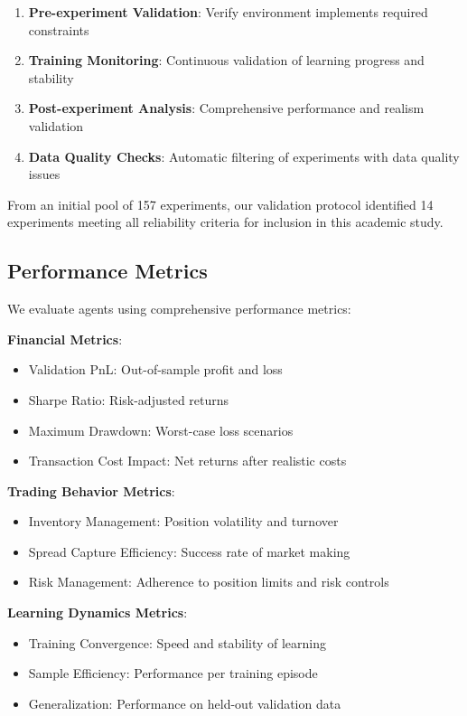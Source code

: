 \documentclass[11pt,a4paper]{article}
\begin{document}
\begin{enumerate}
\item \textbf{Pre-experiment Validation}: Verify environment implements required constraints
\item \textbf{Training Monitoring}: Continuous validation of learning progress and stability
\item \textbf{Post-experiment Analysis}: Comprehensive performance and realism validation
\item \textbf{Data Quality Checks}: Automatic filtering of experiments with data quality issues
\end{enumerate}

From an initial pool of 157 experiments, our validation protocol identified 14 experiments meeting all reliability criteria for inclusion in this academic study.

\subsection{Performance Metrics}

We evaluate agents using comprehensive performance metrics:

\textbf{Financial Metrics}:
\begin{itemize}
\item Validation PnL: Out-of-sample profit and loss
\item Sharpe Ratio: Risk-adjusted returns
\item Maximum Drawdown: Worst-case loss scenarios
\item Transaction Cost Impact: Net returns after realistic costs
\end{itemize}

\textbf{Trading Behavior Metrics}:
\begin{itemize}
\item Inventory Management: Position volatility and turnover
\item Spread Capture Efficiency: Success rate of market making
\item Risk Management: Adherence to position limits and risk controls
\end{itemize}

\textbf{Learning Dynamics Metrics}:
\begin{itemize}
\item Training Convergence: Speed and stability of learning
\item Sample Efficiency: Performance per training episode
\item Generalization: Performance on held-out validation data
\end{itemize}
\n\n
\end{document}

